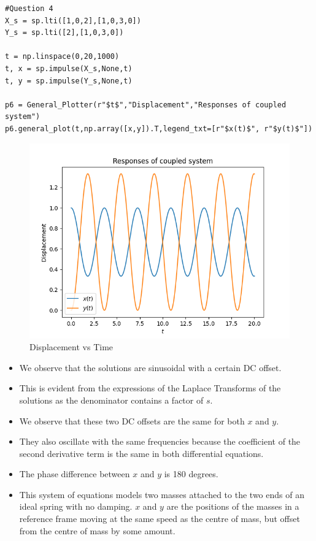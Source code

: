 \documentclass{article}
\begin{document}
\begin{lstlisting}
#Question 4
X_s = sp.lti([1,0,2],[1,0,3,0])
Y_s = sp.lti([2],[1,0,3,0])

t = np.linspace(0,20,1000)
t, x = sp.impulse(X_s,None,t)
t, y = sp.impulse(Y_s,None,t)

p6 = General_Plotter(r"$t$","Displacement","Responses of coupled system")
p6.general_plot(t,np.array([x,y]).T,legend_txt=[r"$x(t)$", r"$y(t)$"])
\end{lstlisting}

\begin{figure}[h!]
\centering
\includegraphics[scale=0.6]{plots/Responses of coupled system.png}
\caption{Displacement vs Time}
\label{Displacement X vs Time}
\end{figure}
\newpage

\begin{itemize}
    \item
      We observe that the solutions are sinusoidal with a certain DC offset.
    \item
      This is evident from the expressions of the Laplace Transforms of the
      solutions as the denominator contains a factor of \(s\).
    \item
      We observe that these two DC offsets are the same for both \(x\) and
      \(y\).
    \item
      They also oscillate with the same frequencies because the coefficient
      of the second derivative term is the same in both differential
      equations.
    
    \item
      The phase difference between \(x\) and \(y\) is 180 degrees.
      


    \item
      This system of equations models two masses attached to the two ends of
      an ideal spring with no damping. \(x\) and \(y\) are the positions of
      the masses in a reference frame moving at the same speed as the centre
      of mass, but offset from the centre of mass by some amount.
    
    \end{itemize}
\end{document}
